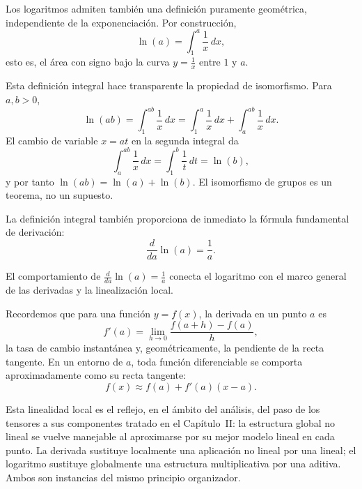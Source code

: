 \medskip

Los logaritmos admiten también una definición puramente geométrica,
independiente de la exponenciación.
Por construcción,
\[
\ln(a)=\int_1^a \frac{1}{x}\,dx,
\]
esto es, el área con signo bajo la curva $y=\frac{1}{x}$ entre $1$ y $a$.

\medskip

Esta definición integral hace transparente la propiedad de isomorfismo.
Para $a,b>0$,
\[
\ln(ab)
=\int_1^{ab}\frac{1}{x}\,dx
=\int_1^{a}\frac{1}{x}\,dx+\int_a^{ab}\frac{1}{x}\,dx.
\]
El cambio de variable $x=at$ en la segunda integral da
\[
\int_a^{ab}\frac{1}{x}\,dx=\int_1^{b}\frac{1}{t}\,dt=\ln(b),
\]
y por tanto $\ln(ab)=\ln(a)+\ln(b)$.
El isomorfismo de grupos es un teorema, no un supuesto.

\medskip

La definición integral también proporciona de inmediato la fórmula fundamental
de derivación:
\[
\frac{d}{da}\ln(a)=\frac{1}{a}.
\]


\medskip

El comportamiento de $\frac{d}{da}\ln(a) = \frac{1}{a}$ conecta el logaritmo
con el marco general de las derivadas y la linealización local.

\medskip

Recordemos que para una función $y = f(x)$, la derivada en un punto $a$ es
\[
f'(a) = \lim_{h\to0}\frac{f(a+h)-f(a)}{h},
\]
la tasa de cambio instantánea y, geométricamente, la pendiente de la recta
tangente.
En un entorno de $a$, toda función diferenciable se comporta aproximadamente
como su recta tangente:
\[
f(x) \approx f(a) + f'(a)(x-a).
\]

\medskip

Esta linealidad local es el reflejo, en el ámbito del análisis, del paso de
los tensores a sus componentes tratado en el Capítulo~II: la estructura global
no lineal se vuelve manejable al aproximarse por su mejor modelo lineal en
cada punto.
La derivada sustituye localmente una aplicación no lineal por una lineal;
el logaritmo sustituye globalmente una estructura multiplicativa por una
aditiva.
Ambos son instancias del mismo principio organizador.

